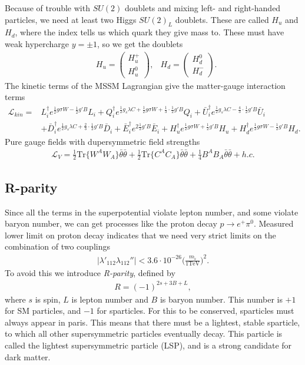 \documentclass[twoside,english]{uiofysmaster}
\begin{document}
Because of trouble with $SU(2)$ doublets and mixing left- and right-handed particles, we need at least two Higgs $SU(2)_L$ doublets. These are called $H_u$ and $H_d$, where the index tells us which quark they give mass to. These must have weak hypercharge $y = \pm 1$, so we get the doublets
\begin{align}
&H_u = \begin{pmatrix}
H_u^+\\
H_u^0
\end{pmatrix},
&H_d = \begin{pmatrix}
H_d^0\\
H_d^-
\end{pmatrix}.
\end{align}  
The kinetic terms of the MSSM Lagrangian give the matter-gauge interaction terms
\begin{align}\label{Eq:: MSSM kinetic Lagrangian}
\mathcal{L}_{kin} =& L_i^{\dagger}e^{\frac{1}{2}g \sigma W - \frac{1}{2}g'B } L_i + Q_i^{\dagger} e^{\frac{1}{2}g_s\lambda C + \frac{1}{2} g \sigma W + \frac{1}{3} \cdot \frac{1}{2} g' B} Q_i + \bar{U}_i^{\dagger} e^{\frac{1}{2}g_s \lambda C - \frac{4}{3} \cdot \frac{1}{2} g'B} \bar{U}_i\\
&+ \bar{D}_i^{\dagger} e^{\frac{1}{2}g_s \lambda C + \frac{2}{3} \cdot \frac{1}{2} g' B} \bar{D}_i + \bar{E}_i^{\dagger} e^{2 \frac{1}{2}g'B} \bar{E}_i + H_u^{\dagger} e^{\frac{1}{2} g \sigma W + \frac{1}{2} g' B}H_u + H_d^{\dagger} e^{\frac{1}{2} g \sigma W - \frac{1}{2} g' B} H_d.
\end{align}
Pure gauge fields with dupersymmetric field strengths
\begin{align}
\mathcal{L}_V = \frac{1}{2} \text{Tr} \{ W^AW_A \} \bar{\theta} \bar{\theta} + \frac{1}{2} \text{Tr} \{ C^AC_A \} \bar{\theta} \bar{\theta} + \frac{1}{4} B^AB_A \bar{\theta} \bar{\theta} + h.c.
\end{align}

\subsection*{R-parity}
Since all the terms in the superpotential violate lepton number, and some violate baryon number, we can get processes like the proton decay $p \rightarrow e^+ \pi^0$. Measured lower limit on proton decay indicates that we need very strict limits on the combination of two couplings
\begin{align*}
|\lambda'_{112} \lambda_{112}''| < 3.6 \cdot 10^{-26} \Big( \frac{m_{\tilde{s}}}{1 \text{TeV}} \Big)^2.
\end{align*}
To avoid this we introduce \textit{R-parity}, defined by
\begin{align}
R = (-1)^{2s+3B+L},
\end{align}
where $s$ is spin, $L$ is lepton number and $B$ is baryon number. This number is $+1$ for SM particles, and $-1$ for sparticles. For this to be conserved, sparticles must always appear in paris. This means that there must be a lightest, stable sparticle, to which all other supersymmetric particles eventually decay. This particle is called the lightest supersymmetric particle (LSP), and is a strong candidate for dark matter.
\end{document}
